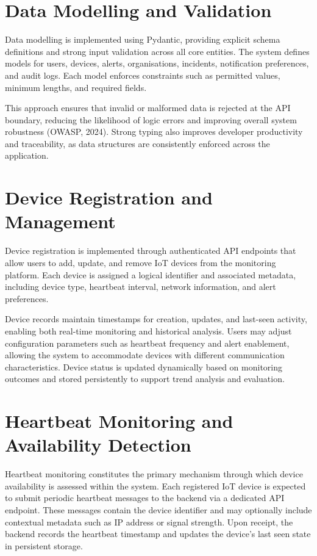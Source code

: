 \section{Data Modelling and Validation}

Data modelling is implemented using Pydantic, providing explicit schema definitions and strong input validation across all core entities. The system defines models for users, devices, alerts, organisations, incidents, notification preferences, and audit logs. Each model enforces constraints such as permitted values, minimum lengths, and required fields.

This approach ensures that invalid or malformed data is rejected at the API boundary, reducing the likelihood of logic errors and improving overall system robustness (OWASP, 2024). Strong typing also improves developer productivity and traceability, as data structures are consistently enforced across the application.

\section{Device Registration and Management}

Device registration is implemented through authenticated API endpoints that allow users to add, update, and remove IoT devices from the monitoring platform. Each device is assigned a logical identifier and associated metadata, including device type, heartbeat interval, network information, and alert preferences.

Device records maintain timestamps for creation, updates, and last-seen activity, enabling both real-time monitoring and historical analysis. Users may adjust configuration parameters such as heartbeat frequency and alert enablement, allowing the system to accommodate devices with different communication characteristics. Device status is updated dynamically based on monitoring outcomes and stored persistently to support trend analysis and evaluation.

\section{Heartbeat Monitoring and Availability Detection}

Heartbeat monitoring constitutes the primary mechanism through which device availability is assessed within the system. Each registered IoT device is expected to submit periodic heartbeat messages to the backend via a dedicated API endpoint. These messages contain the device identifier and may optionally include contextual metadata such as IP address or signal strength. Upon receipt, the backend records the heartbeat timestamp and updates the device's last seen state in persistent storage.


